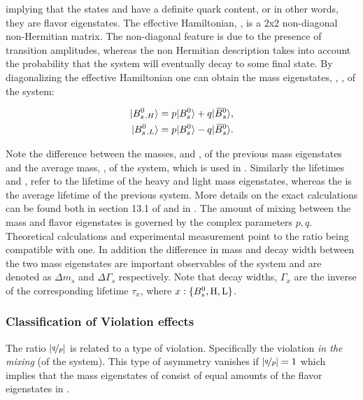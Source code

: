 \noindent implying that the states \Bs and \Bsb have a definite quark content, or in other words,
they are flavor eigenstates. The effective Hamiltonian, \Heff, is a 2x2 non-diagonal non-Hermitian matrix.
The non-diagonal feature is due to the presence of \BBbarSyst transition amplitudes,
whereas the non Hermitian description takes into account the probability that the system will
eventually decay to some final state. By diagonalizing the effective Hamiltonian one can obtain
the mass eigenstates, , , of the system:

\begin{align}
  \centering
  \ket{\BsH} &= p \ket{\Bs} + q \ket{\Bsb}, \nonumber \\
  \ket{\BsL} &= p \ket{\Bs} - q \ket{\Bsb}.
  \label{bs_mass_eigen}
\end{align}

\noindent Note the difference between the masses, \mass{\BsH} and \mass{\BsL}, of the previous mass
eigenstates and the average mass, \mass{\Bs}, of the \BBbarSyst system, which is used in .
Similarly the lifetimes \tauH and \tauL, refer to the lifetime of the heavy and light mass eigenstates, whereas
the \tauBs is the average lifetime of the previous system. More details on the exact calculations can be found both in section 13.1
of \cite{PDG} and in \cite{jeroenThesis,DeBruyn-thesis}. The amount of mixing between the mass
and flavor eigenstates is governed by the complex parameters $p,q$.
Theoretical calculations \cite{Lenz:2011ti} and experimental measurement \cite{asl-paper} point to the ratio
\qoverp being compatible with one. In addition the difference in mass and decay width between the two mass
eigenstates are important observables of the \BBbarSyst system and are denoted as $\Delta m_s$ and $\Delta\Gamma_s$
respectively. Note that decay widths, $\Gamma_x$ are the inverse of the corresponding lifetime $\tau_x$, where $x:\{B^0_s,{\rm H},{\rm L}\}$.

\subsubsection{Classification of \CP Violation effects}
The ratio $|\nicefrac{q}{p}|$ is related to a type of \CP violation. Specifically the \CP violation {\it in the mixing}
(of the \BBbarSyst system). This type of \CP asymmetry vanishes if $|\nicefrac{q}{p}|= 1$ which implies that the mass
eigenstates of  consist of equal amounts of the flavor eigenstates in .

